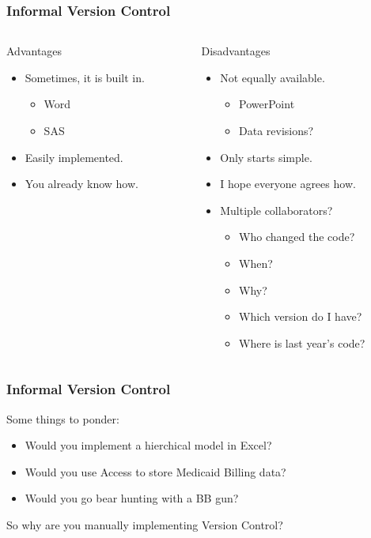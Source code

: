 \documentclass{beamer}
\begin{document}
\begin{frame} %
  \frametitle{Informal Version Control}
  \begin{columns}[t]
    \begin{column}{.5\textwidth}
      {\large Advantages}
      \begin{itemize}
      \item Sometimes, it is built in.
        \begin{itemize}
        \item Word
        \item SAS
        \end{itemize}
      \item Easily implemented.
      \item You already know how.
      \end{itemize}
    \end{column}
    
    \begin{column}{.5\textwidth}
      {\large Disadvantages}
      \begin{itemize}
      \item Not equally available.
        \begin{itemize}
        \item PowerPoint
        \item Data revisions?
        \end{itemize}
      \item Only starts simple.
      \item I hope everyone agrees how.
      \item Multiple collaborators?
        \begin{itemize}
        \item Who changed the code?
        \item When?  
        \item Why?
        \item Which version do I have?
        \item Where is last year's code?
        \end{itemize}
      \end{itemize}
    \end{column}
  \end{columns}
\end{frame}

\begin{frame} %
  \frametitle{Informal Version Control}

  Some things to ponder:
  \bigskip
  \begin{itemize}
  \item Would you implement a hierchical model in Excel?
  \item Would you use Access to store Medicaid Billing data?
  \item Would you go bear hunting with a BB gun?
  \end{itemize}
  \pause
  \bigskip
  \bigskip
  {\large So why are you manually implementing Version Control?}
  
\end{frame}
\end{document}
